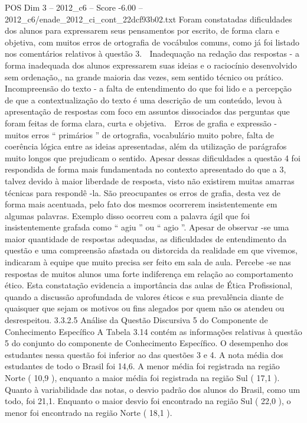 \begin{textsample}{POS Dim 3 – 2012\_c6 – Score -6.00 – 2012\_c6/enade\_2012\_ci\_cont\_22dcf93b02.txt}
Foram constatadas dificuldades dos alunos para expressarem seus pensamentos por escrito, de forma clara e objetiva, com muitos erros de ortografia de vocábulos comuns, como já foi listado nos comentários relativos à questão 3.  Inadequação na redação das respostas - a forma inadequada dos alunos expressarem suas ideias e o raciocínio desenvolvido sem ordenação,, na grande maioria das vezes, sem sentido técnico ou prático.  Incompreensão do texto - a falta de entendimento do que foi lido e a percepção de que a contextualização do texto é uma descrição de um conteúdo, levou à apresentação de respostas com foco em assuntos dissociados das perguntas que foram feitas de forma clara, curta e objetiva.  Erros de grafia e expressão - muitos erros “ primários ” de ortografia, vocabulário muito pobre, falta de coerência lógica entre as ideias apresentadas, além da utilização de parágrafos muito longos que prejudicam o sentido.
Apesar dessas dificuldades a questão 4 foi respondida de forma mais fundamentada no contexto apresentado do que a 3, talvez devido à maior liberdade de resposta, visto não existirem muitas amarras técnicas para respondê -la.
São preocupantes os erros de grafia, desta vez de forma mais acentuada, pelo fato dos mesmos ocorrerem insistentemente em algumas palavras.
Exemplo disso ocorreu com a palavra ágil que foi insistentemente grafada como “ agiu ” ou “ agio ”.
Apesar de observar -se uma maior quantidade de respostas adequadas, as dificuldades de entendimento da questão e uma compreensão afastada ou distorcida da realidade em que vivemos, indicaram à equipe que muito precisa ser feito em sala de aula.
Percebe -se nas respostas de muitos alunos uma forte indiferença em relação ao comportamento ético.
Esta constatação evidencia a importância das aulas de Ética Profissional, quando a discussão aprofundada de valores éticos e sua prevalência diante de quaisquer que sejam os motivos ou fins alegados por quem não os atendeu ou desrespeitou. 3.3.2.5 Análise da Questão Discursiva 5 do Componente de Conhecimento Específico A Tabela 3.14 contém as informações relativas à questão 5 do conjunto do componente de Conhecimento Específico.
O desempenho dos estudantes nessa questão foi inferior ao das questões 3 e 4.
A nota média dos estudantes de todo o Brasil foi 14,6.
A menor média foi registrada na região Norte ( 10,9 ), enquanto a maior média foi registrada na região Sul ( 17,1 ).
Quanto à variabilidade das notas, o desvio padrão dos alunos do Brasil, como um todo, foi 21,1.
Enquanto o maior desvio foi encontrado na região Sul ( 22,0 ), o menor foi encontrado na região Norte ( 18,1 ).

\end{textsample}
